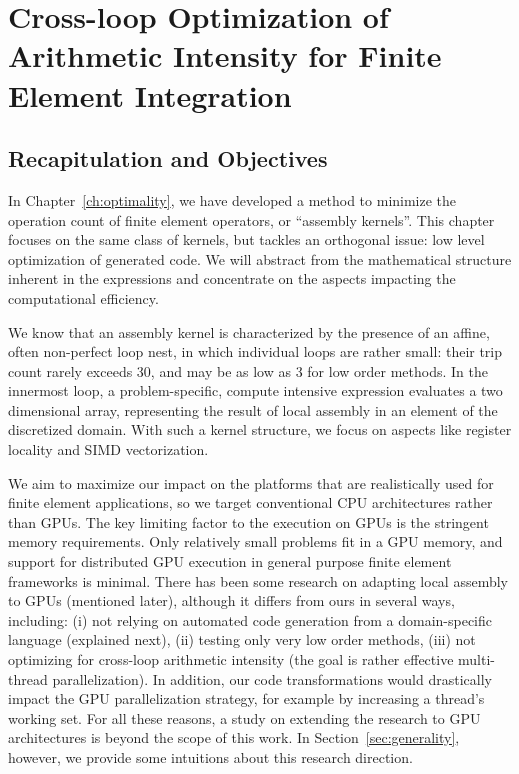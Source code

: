 \chapter{Cross-loop Optimization of Arithmetic Intensity for Finite Element Integration}
\label{ch:lowlevelopt}

\section{Recapitulation and Objectives}
In Chapter~\ref{ch:optimality}, we have developed a method to minimize the operation count of finite element operators, or ``assembly kernels''. This chapter focuses on the same class of kernels, but tackles an orthogonal issue: low level optimization of generated code. We will abstract from the mathematical structure inherent in the expressions and concentrate on the aspects impacting the computational efficiency.

We know that an assembly kernel is characterized by the presence of an affine, often non-perfect loop nest, in which individual loops are rather small: their trip count rarely exceeds 30, and may be as low as 3 for low order methods. In the innermost loop, a problem-specific, compute intensive expression evaluates a two dimensional array, representing the result of local assembly in an element of the discretized domain. With such a kernel structure, we focus on aspects like register locality and SIMD vectorization.

We aim to maximize our impact on the platforms that are realistically used for finite element applications, so we target conventional CPU architectures rather than GPUs. The key limiting factor to the execution on GPUs is the stringent memory requirements. Only relatively small problems fit in a GPU memory, and support for distributed GPU execution in general purpose finite element frameworks is minimal. There has been some research on adapting local assembly to GPUs (mentioned later), although it differs from ours in several ways, including: (i) not relying on automated code generation from a domain-specific language (explained next), (ii) testing only very low order methods, (iii) not optimizing for cross-loop arithmetic intensity (the goal is rather effective multi-thread parallelization). In addition, our code transformations would drastically impact the GPU parallelization strategy, for example by increasing a thread's working set. For all these reasons, a study on extending the research to GPU architectures is beyond the scope of this work. In Section~\ref{sec:generality}, however, we provide some intuitions about this research direction.

